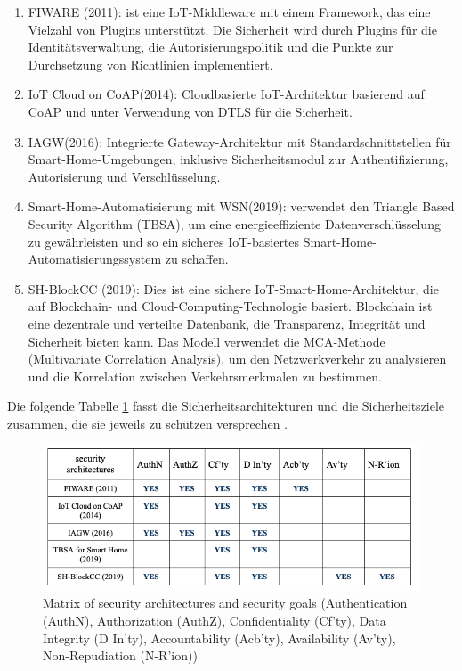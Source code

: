  \begin{enumerate}
 \item FIWARE (2011): ist eine IoT-Middleware mit einem Framework, das eine Vielzahl von Plugins unterstützt. Die Sicherheit wird durch Plugins für die Identitätsverwaltung, die Autorisierungspolitik und die Punkte zur Durchsetzung von Richtlinien implementiert.
    \item IoT Cloud on CoAP(2014): Cloudbasierte IoT-Architektur basierend auf CoAP und unter Verwendung von DTLS für die Sicherheit.

    \item IAGW(2016): Integrierte Gateway-Architektur mit Standardschnittstellen für Smart-Home-Umgebungen, inklusive Sicherheitsmodul zur Authentifizierung, Autorisierung und Verschlüsselung.
    \item Smart-Home-Automatisierung mit WSN(2019): verwendet den Triangle Based Security Algorithm (TBSA), um eine energieeffiziente Datenverschlüsselung zu gewährleisten und so ein sicheres IoT-basiertes Smart-Home-Automatisierungssystem zu schaffen.
    
    \item SH-BlockCC (2019): Dies ist eine sichere IoT-Smart-Home-Architektur, die auf Blockchain- und Cloud-Computing-Technologie basiert. Blockchain ist eine dezentrale und verteilte Datenbank, die Transparenz, Integrität und Sicherheit bieten kann\cite{singh2019sh}\cite{dorri2017blockchain}. Das Modell verwendet die MCA-Methode (Multivariate Correlation Analysis), um den Netzwerkverkehr zu analysieren und die Korrelation zwischen Verkehrsmerkmalen zu bestimmen.
 \end{enumerate}
Die folgende Tabelle \ref{fig:vergleich} fasst die Sicherheitsarchitekturen und die Sicherheitsziele zusammen, die sie jeweils zu schützen versprechen \cite{khatoun2022cybersecurity}.

\begin{figure}[h]
  \centering
  \includegraphics[scale=0.48]{resources/vergleich.png}
  \caption{Matrix of security architectures and security goals (Authentication (AuthN), Authorization (AuthZ), Confidentiality (Cf’ty), Data Integrity (D In’ty), Accountability (Acb’ty), Availability (Av’ty), Non-Repudiation (N-R’ion))}
  \label{fig:vergleich}
\end{figure}\


